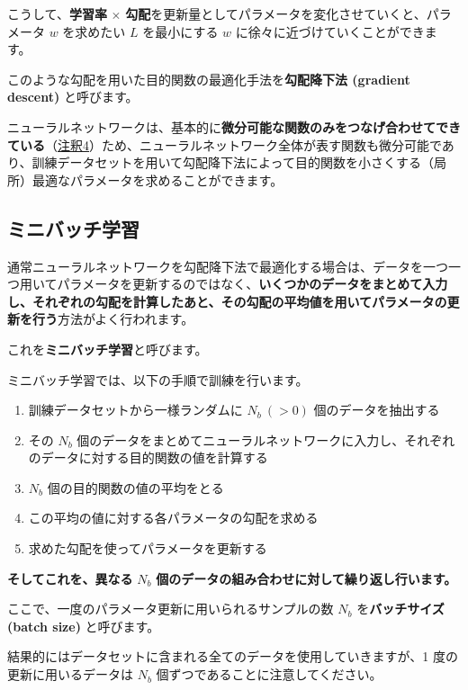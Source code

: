 こうして、\textbf{学習率} $\times$ \textbf{勾配}を更新量としてパラメータを変化させていくと、パラメータ $w$ を求めたい $L$ を最小にする $w$ に徐々に近づけていくことができます。


このような勾配を用いた目的関数の最適化手法を\textbf{勾配降下法 (gradient descent)} と呼びます。

ニューラルネットワークは、基本的に\textbf{微分可能な関数のみをつなげ合わせてできている}（\hyperref[23-basics-of-neural-networks-note4]{注釈4}）ため、ニューラルネットワーク全体が表す関数も微分可能であり、訓練データセットを用いて勾配降下法によって目的関数を小さくする（局所）最適なパラメータを求めることができます。


\subsection{ミニバッチ学習}


通常ニューラルネットワークを勾配降下法で最適化する場合は、データを一つ一つ用いてパラメータを更新するのではなく、\textbf{いくつかのデータをまとめて入力し、それぞれの勾配を計算したあと、その勾配の平均値を用いてパラメータの更新を行う}方法がよく行われます。

これを\textbf{ミニバッチ学習}と呼びます。




ミニバッチ学習では、以下の手順で訓練を行います。


\begin{enumerate}
\item 訓練データセットから一様ランダムに $N_{b} \ (>0)$ 個のデータを抽出する
\item その $N_{b}$ 個のデータをまとめてニューラルネットワークに入力し、それぞれのデータに対する目的関数の値を計算する
\item $N_b$ 個の目的関数の値の平均をとる
\item この平均の値に対する各パラメータの勾配を求める
\item 求めた勾配を使ってパラメータを更新する
\end{enumerate}


\textbf{そしてこれを、異なる} $N_{b}$ \textbf{個のデータの組み合わせに対して繰り返し行います。}



ここで、一度のパラメータ更新に用いられるサンプルの数 $N_{b}$ を\textbf{バッチサイズ (batch size)} と呼びます。

結果的にはデータセットに含まれる全てのデータを使用していきますが、1 度の更新に用いるデータは $N_{b}$ 個ずつであることに注意してください。


